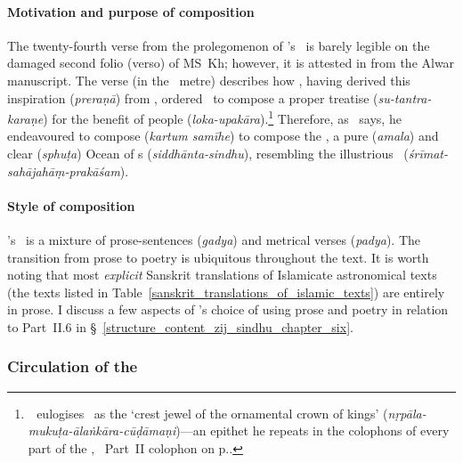 \paragraph{Motivation and purpose of composition}\label{motivation_purpose_of_siddhantasindhu} 
The twenty-fourth verse from the prolegomenon of \Nityananda's \Siddhantasindhu\ is barely legible on the damaged second folio (verso) of MS~Kh; however, it is attested in \textcite[231]{PetersonCatalogue} from the Alwar manuscript. The verse (in the \sardulavikridita\ metre) describes how \AsafKhanshort, having derived this inspiration (\textit{preraṇā}) from \Shahjahan, ordered \Nityananda\ to compose a proper treatise (\textit{su-tantra-karaṇe}) for the benefit of people (\textit{loka-upakāra}).\footnote{\,\Nityananda\ eulogises \Shahjahan\ as the `crest jewel of the ornamental crown of kings' (\textit{nṛpāla-mukuṭa-ālaṅkāra-cūḍāmaṇi})---an epithet he repeats in the colophons of every part of the \Siddhantasindhu, \eg \vid\ Part~II colophon on p.\thinspace \pageref{partII_colophon_sanskrit}.} Therefore, as \Nityananda\ says, he endeavoured to compose (\textit{kartum samīhe}) to compose the \Siddhantasindhu, a pure (\textit{amala}) and clear (\textit{sphuṭa}) Ocean of \Siddhanta s (\textit{siddhānta-sindhu}), resembling the illustrious \ZijiShahJahani\ (\textit{śrīmat-sahājahāṃ-prakāśam}). 


\paragraph{Style of composition} \label{prose_poetry_mixed_form}   
\Nityananda's \Siddhantasindhu\ is a mixture of prose-sentences (\textit{gadya}) and metrical verses (\textit{padya}). The transition from prose to poetry is ubiquitous throughout the text. It is worth noting that most \textit{explicit} Sanskrit translations of Islamicate astronomical texts (\eg the texts listed in Table~\ref{sanskrit_translations_of_islamic_texts}) are entirely in prose. I discuss a few aspects of \Nityananda's choice of using prose and poetry in relation to Part~II.6 in \S~\ref{structure_content_zij_sindhu_chapter_six}.
    
\subsubsection{Circulation of the \Siddhantasindhu} \label{circualtion_siddhantasindhu}

